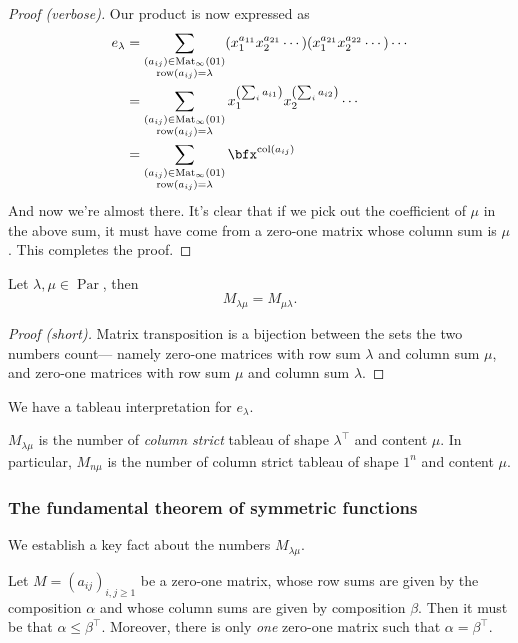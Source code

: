\documentclass{article}
\DeclareMathOperator{\row}{row}
\DeclareMathOperator{\col}{col}
\DeclareMathOperator{\Par}{Par}
\DeclareMathOperator{\Mat}{Mat}
\begin{document}
\begin{proof}[Proof (verbose)]
    Our product is now expressed as
    \begin{align*}
        e_\lambda 
        &=
        \sum_{\substack{(a_{ij})\in\Mat_\infty(01)\\\row(a_{ij}) = \lambda}} (x_1^{a_{11}}x_2^{a_{21}}\cdots)(x_1^{a_{21}}x_2^{a_{22}}\cdots)\cdots \\
        &= 
        \sum_{\substack{(a_{ij})\in\Mat_\infty(01)\\\row(a_{ij}) = \lambda}} x_1^{\left(\sum_i a_{i1}\right)}x_2^{\left(\sum_i a_{i2}\right)} \cdots \\
        &= 
        \sum_{\substack{(a_{ij})\in\Mat_\infty(01)\\\row(a_{ij}) = \lambda}} \bfx^{\col(a_{ij})}
    \end{align*}
    And now we're almost there.
    It's clear that if we pick out the coefficient of $\mu$ in the above sum, it must have come from a zero-one matrix whose column sum is $\mu$.
    This completes the proof.
\end{proof}

\begin{theorem} \label{thm:e2msymmetric}
    Let $\lambda,\mu \in \Par$, then
    \[
        M_{\lambda\mu} = M_{\mu\lambda}.
    \]
\end{theorem}

\begin{proof}
    [Proof (short)]
    Matrix transposition is a bijection between the sets the two numbers count--- namely zero-one matrices with row sum $\lambda$ and column sum $\mu$, and zero-one matrices with row sum $\mu$ and column sum $\lambda$.
\end{proof}

We have a tableau interpretation for $e_\lambda$.

\begin{theorem}
    $M_{\lambda\mu}$ is the number of \textit{column strict} tableau of shape $\lambda^\top$ and content $\mu$.
    In particular, $M_{n\mu}$ is the number of column strict tableau of shape $1^n$ and content $\mu$.
\end{theorem}

\subsubsection{The fundamental theorem of symmetric functions}

We establish a key fact about the numbers $M_{\lambda\mu}$.
\begin{theorem} \label{thm:galeryser} Let $M = (a_{ij})_{i,j \geq 1}$ be a zero-one matrix, whose row sums are given by the composition $\alpha$ and whose column sums are given by composition $\beta$. Then it must be that $\alpha \leq \beta^\top$. Moreover, there is only \textit{one} zero-one matrix such that $\alpha = \beta^\top$.
\end{theorem}
\end{document}
